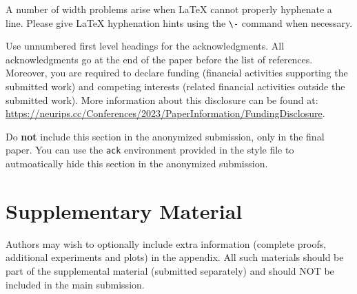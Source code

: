 \documentclass{article}
\begin{document}
A number of width problems arise when \LaTeX{} cannot properly hyphenate a
line. Please give LaTeX hyphenation hints using the \verb+\-+ command when
necessary.


\begin{ack}
Use unnumbered first level headings for the acknowledgments. All acknowledgments
go at the end of the paper before the list of references. Moreover, you are required to declare
funding (financial activities supporting the submitted work) and competing interests (related financial activities outside the submitted work).
More information about this disclosure can be found at: \url{https://neurips.cc/Conferences/2023/PaperInformation/FundingDisclosure}.


Do {\bf not} include this section in the anonymized submission, only in the final paper. You can use the \texttt{ack} environment provided in the style file to autmoatically hide this section in the anonymized submission.
\end{ack}



\section{Supplementary Material}

Authors may wish to optionally include extra information (complete proofs, additional experiments and plots) in the appendix. All such materials should be part of the supplemental material (submitted separately) and should NOT be included in the main submission.




\end{document}
